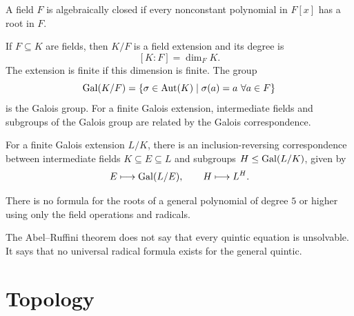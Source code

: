     \begin{definition}
        A field $F$ is algebraically closed if every nonconstant polynomial in
        $F[x]$ has a root in $F$.
    \end{definition}

    \begin{definition}
        If $F\subseteq K$ are fields, then $K/F$ is a field extension and its
        degree is
        \[
            [K:F]=\dim_F K.
        \]
        The extension is finite if this dimension is finite. The group
        \[
            \operatorname{Gal}(K/F)
            =
            \{\sigma\in\operatorname{Aut}(K)\mid \sigma(a)=a\ \forall a\in F\}
        \]
        is the Galois group. For a finite Galois extension, intermediate fields
        and subgroups of the Galois group are related by the Galois
        correspondence.
    \end{definition}

    \begin{theorem}
        For a finite Galois extension $L/K$, there is an inclusion-reversing
        correspondence between intermediate fields $K\subseteq E\subseteq L$ and
        subgroups $H\leq \operatorname{Gal}(L/K)$, given by
        \[
            E\longmapsto \operatorname{Gal}(L/E),
            \qquad
            H\longmapsto L^H.
        \]
    \end{theorem}

    \begin{theorem}
        There is no formula for the roots of a general polynomial of degree $5$
        or higher using only the field operations and radicals.
    \end{theorem}

    \begin{remark}
        The Abel--Ruffini theorem does not say that every quintic equation is
        unsolvable. It says that no universal radical formula exists for the
        general quintic.
    \end{remark}

    \chapter{Topology}



